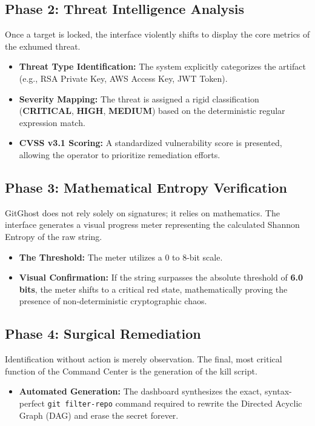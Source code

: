 \documentclass[12pt, a4paper, oneside]{report}
\begin{document}
\subsection{Phase 2: Threat Intelligence Analysis}
Once a target is locked, the interface violently shifts to display the core metrics of the exhumed threat.
\begin{itemize}
    \item \textbf{Threat Type Identification:} The system explicitly categorizes the artifact (e.g., RSA Private Key, AWS Access Key, JWT Token).
    \item \textbf{Severity Mapping:} The threat is assigned a rigid classification (\textbf{CRITICAL}, \textbf{HIGH}, \textbf{MEDIUM}) based on the deterministic regular expression match.
    \item \textbf{CVSS v3.1 Scoring:} A standardized vulnerability score is presented, allowing the operator to prioritize remediation efforts.
\end{itemize}

\subsection{Phase 3: Mathematical Entropy Verification}
GitGhost does not rely solely on signatures; it relies on mathematics. The interface generates a visual progress meter representing the calculated Shannon Entropy of the raw string.
\begin{itemize}
    \item \textbf{The Threshold:} The meter utilizes a 0 to 8-bit scale. 
    \item \textbf{Visual Confirmation:} If the string surpasses the absolute threshold of \textbf{6.0 bits}, the meter shifts to a critical red state, mathematically proving the presence of non-deterministic cryptographic chaos.
\end{itemize}

\subsection{Phase 4: Surgical Remediation}
Identification without action is merely observation. The final, most critical function of the Command Center is the generation of the kill script.
\begin{itemize}
    \item \textbf{Automated Generation:} The dashboard synthesizes the exact, syntax-perfect \texttt{git filter-repo} command required to rewrite the Directed Acyclic Graph (DAG) and erase the secret forever.
\end{itemize}
\end{document}
